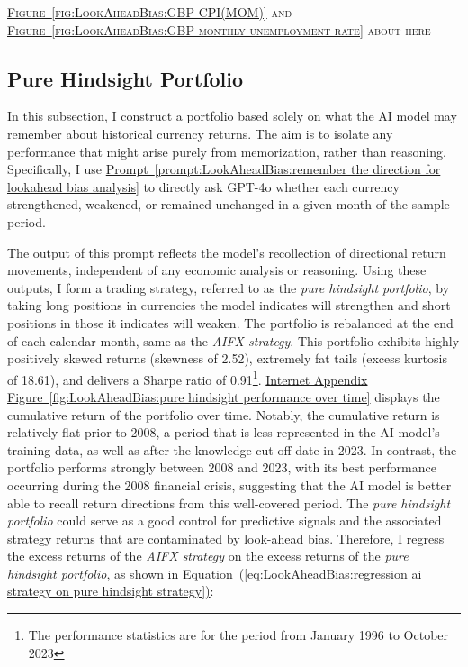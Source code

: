 \documentclass[12pt,oneside,letter]{article}
\newcommand*{\myfig}[1]{\hyperref[{#1}]{Figure~\ref*{#1}}}
\newcommand*{\myprp}[1]{\hyperref[{#1}]{Prompt~\ref*{#1}}}
\newcommand*{\myeq}[1]{\hyperref[{#1}]{Equation~(\ref*{#1})}}
\newcommand*{\myfigIA}[1]{\hyperref[{#1}]{Internet Appendix Figure~\ref*{#1}}}
\begin{document}
		\begin{center}
			\textsc{\myfig{fig:LookAheadBias:GBP CPI(MOM)} and \myfig{fig:LookAheadBias:GBP monthly unemployment rate} about here}  
		\end{center}
		
		
		\subsection{Pure Hindsight Portfolio}	\label{sec:Pure Hindsight Portfolio}
		In this subsection, I construct a portfolio based solely on what the AI model may remember about historical currency returns. The aim is to isolate any performance that might arise purely from memorization, rather than reasoning. Specifically, I use \myprp{prompt:LookAheadBias:remember the direction for lookahead bias analysis} to directly ask GPT-4o whether each currency strengthened, weakened, or remained unchanged in a given month of the sample period.
		\begin{prompt}[H] 
			\centering
			\caption{}
			\label{prompt:LookAheadBias:remember the direction for lookahead bias analysis}
		\end{prompt} 
		\vspace{-20pt}The output of this prompt reflects the model’s recollection of directional return movements, independent of any economic analysis or reasoning. Using these outputs, I form a trading strategy, referred to as the \textit{pure hindsight portfolio}, by taking long positions in currencies the model indicates will strengthen and short positions in those it indicates will weaken. The portfolio is rebalanced at the end of each calendar month, same as the \textit{AIFX strategy}. This portfolio exhibits highly positively skewed returns (skewness of 2.52), extremely fat tails (excess kurtosis of 18.61), and delivers a Sharpe ratio of 0.91\footnote{The performance statistics are for the period from January 1996 to October 2023}. \myfigIA{fig:LookAheadBias:pure hindsight performance over time} displays the cumulative return of the portfolio over time. Notably, the cumulative return is relatively flat prior to 2008, a period that is less represented in the AI model’s training data, as well as after the knowledge cut-off date in 2023. In contrast, the portfolio performs strongly between 2008 and 2023, with its best performance occurring during the 2008 financial crisis, suggesting that the AI model is better able to recall return directions from this well-covered period. The \textit{pure hindsight portfolio} could serve as a good control for predictive signals and the associated strategy returns that are contaminated by look-ahead bias. Therefore, I regress the excess returns of the \textit{AIFX strategy} on the excess returns of the \textit{pure hindsight portfolio}, as shown in \myeq{eq:LookAheadBias:regression ai strategy on pure hindsight strategy}:
\end{document}

